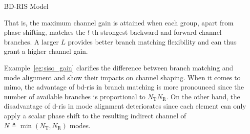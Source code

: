 \begin{section}{BD-RIS Model}
\begin{example}
		That is, the maximum channel gain is attained when each group, apart from phase shifting, matches the $l$-th strongest backward and forward channel branches.
		A larger $L$ provides better branch matching flexibility and can thus grant a higher channel gain.
	\end{example}

	Example~\ref{eg:siso_gain} clarifies the difference between branch matching and mode alignment and show their impacts on channel shaping.
	When it comes to \gls{mimo}, the advantage of \gls{bd}-\gls{ris} in branch matching is more pronounced since the number of available branches is proportional to $N_\mathrm{T} N_\mathrm{R}$. On the other hand, the disadvantage of \gls{d}-\gls{ris} in mode alignment deteriorates since each element can only apply a scalar phase shift to the resulting indirect channel of $N \triangleq \min(N_\mathrm{T}, N_\mathrm{R})$ modes.







\end{section}
